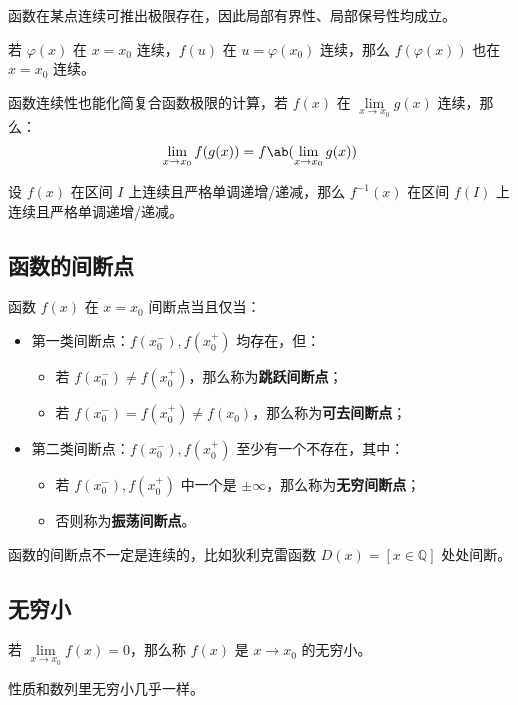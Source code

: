函数在某点连续可推出极限存在，因此局部有界性、局部保号性均成立。

\begin{theorem}[连续函数的复合]
	若 $\varphi(x)$ 在 $x = x_0$ 连续，$f(u)$ 在 $u = \varphi(x_0)$ 连续，那么 $f(\varphi(x))$ 也在 $x = x_0$ 连续。
\end{theorem}

函数连续性也能化简复合函数极限的计算，若 $f(x)$ 在 $\lim\limits_{x \to x_0} g(x)$ 连续，那么：
$$
\lim_{x \to x_0} f(g(x)) = f\ab(\lim_{x \to x_0} g(x))
$$

\begin{theorem}[反函数定理]
	设 $f(x)$ 在区间 $I$ 上连续且严格单调递增/递减，那么 $f^{-1}(x)$ 在区间 $f(I)$ 上连续且严格单调递增/递减。
\end{theorem}

\subsection{函数的间断点}

\begin{definition}[函数的间断点]
	函数 $f(x)$ 在 $x = x_0$ 间断点当且仅当：

	\begin{itemize}
		\item 第一类间断点：$f(x_0^-),f(x_0^+)$ 均存在，但：
		\begin{itemize}
			\item 若 $f(x_0^-) \neq f(x_0^+)$，那么称为\textbf{跳跃间断点}；
			\item 若 $f(x_0^-) = f(x_0^+) \neq f(x_0)$，那么称为\textbf{可去间断点}；
		\end{itemize}

		\item 第二类间断点：$f(x_0^-),f(x_0^+)$ 至少有一个不存在，其中：
		\begin{itemize}
			\item 若 $f(x_0^-),f(x_0^+)$ 中一个是 $\pm \infty$，那么称为\textbf{无穷间断点}；
			\item 否则称为\textbf{振荡间断点}。
		\end{itemize}
	\end{itemize}
\end{definition}

函数的间断点不一定是连续的，比如狄利克雷函数 $D(x) = [x \in \mathbb{Q}]$ 处处间断。

\subsection{无穷小}

若 $\lim\limits_{x \to x_0} f(x) = 0$，那么称 $f(x)$ 是 $x \to x_0$ 的无穷小。

性质和数列里无穷小几乎一样。